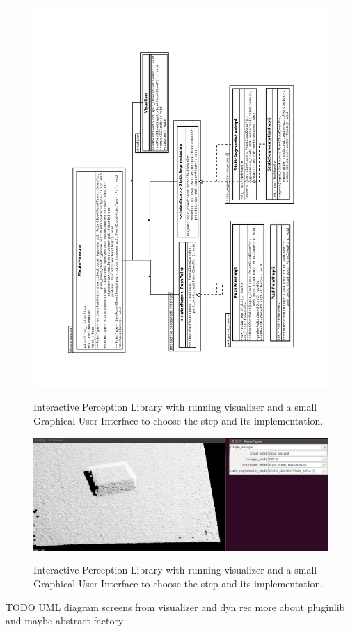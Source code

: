 \begin{figure}[ht]

{\includegraphics[width=1.1\columnwidth, angle=-90]{figures/uml2.pdf}}

\caption{Interactive Perception Library with running visualizer and a small Graphical User Interface to choose the step and its implementation.}
\label{fig:uml}
\end{figure}



\begin{figure}[ht]

{\includegraphics[width=1.1\columnwidth]{figures/ipl.png}}

\caption{Interactive Perception Library with running visualizer and a small Graphical User Interface to choose the step and its implementation.}
\label{fig:ipl}
\end{figure}

TODO		
 UML diagram
 screens from visualizer and dyn rec
 more about pluginlib and maybe abstract factory
